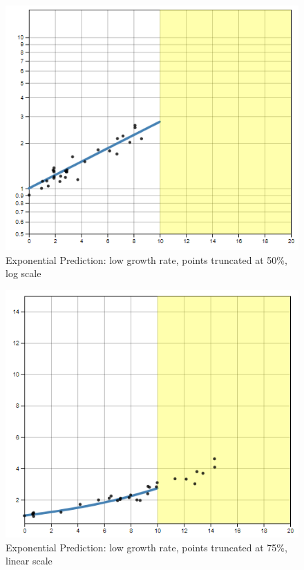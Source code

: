 \documentclass[print]{nuthesis}
\begin{document}
\begin{figure}[tbp]

{\centering \includegraphics[width=0.65\linewidth,]{images/02-you-draw-it/low-10-log} 

}

\caption{Exponential Prediction: low growth rate, points truncated at 50\%, log scale}\label{fig:low-10-log}
\end{figure}

\begin{figure}[tbp]

{\centering \includegraphics[width=0.65\linewidth,]{images/02-you-draw-it/low-15-linear} 

}

\caption{Exponential Prediction: low growth rate, points truncated at 75\%, linear scale}\label{fig:low-15-linear}
\end{figure}
\end{document}
